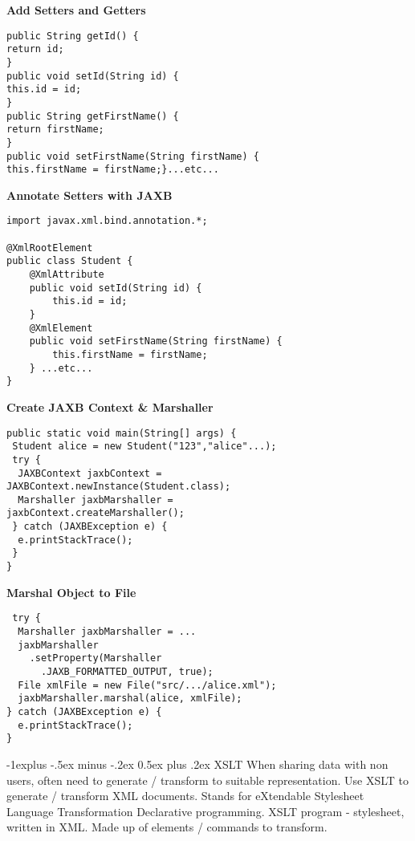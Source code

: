 \documentclass[10pt,landscape]{article}
\makeatletter
\renewcommand{\subsection}{\@startsection{subsection}{2}{0mm}%
                                {-1explus -.5ex minus -.2ex}%
                                {0.5ex plus .2ex}%
                                {\normalfont\normalsize\bfseries}}
\makeatother
\begin{document}
\begin{multicols}{3}
\textbf{Add Setters and Getters}
\begin{lstlisting}
public String getId() {
return id;
}
public void setId(String id) {
this.id = id;
}
public String getFirstName() {
return firstName;
}
public void setFirstName(String firstName) {
this.firstName = firstName;}...etc...
\end{lstlisting}


\textbf{Annotate Setters with JAXB}

\begin{lstlisting}
import javax.xml.bind.annotation.*;

@XmlRootElement
public class Student {
	@XmlAttribute
	public void setId(String id) {
		this.id = id;
	}
	@XmlElement
	public void setFirstName(String firstName) {
		this.firstName = firstName;
	} ...etc...
}
\end{lstlisting}

\textbf{Create JAXB Context \& Marshaller}

\begin{lstlisting}
public static void main(String[] args) {
 Student alice = new Student("123","alice"...);
 try {
  JAXBContext jaxbContext = 
JAXBContext.newInstance(Student.class);
  Marshaller jaxbMarshaller = 
jaxbContext.createMarshaller();
 } catch (JAXBException e) {
  e.printStackTrace();
 }
}
\end{lstlisting}


\textbf{Marshal Object to File}

\begin{lstlisting}
 try {
  Marshaller jaxbMarshaller = ...
  jaxbMarshaller
    .setProperty(Marshaller
      .JAXB_FORMATTED_OUTPUT, true);
  File xmlFile = new File("src/.../alice.xml");
  jaxbMarshaller.marshal(alice, xmlFile);
} catch (JAXBException e) {
  e.printStackTrace();
}
\end{lstlisting}



\subsection{XSLT}
When sharing data with non users, often need to generate / transform to suitable representation.
Use XSLT to generate / transform XML documents.
Stands for eXtendable Stylesheet Language Transformation
Declarative programming.
XSLT program - stylesheet, written in XML.
Made up of elements / commands to transform.






\end{multicols}
\end{document}
